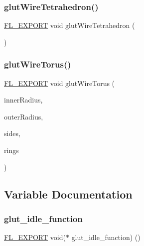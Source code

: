 \subsubsection{\texorpdfstring{glut\+Wire\+Tetrahedron()}{glutWireTetrahedron()}}
{\footnotesize\ttfamily \hyperlink{_fl___export_8_h_aa9ba29a18aee9d738370a06eeb4470fc}{F\+L\+\_\+\+E\+X\+P\+O\+RT} void glut\+Wire\+Tetrahedron (\begin{DoxyParamCaption}{ }\end{DoxyParamCaption})}

\mbox{\label{glut_8_h_adbac466cacdbe5b8241718c2ac9bb27b}} 
\subsubsection{\texorpdfstring{glut\+Wire\+Torus()}{glutWireTorus()}}
{\footnotesize\ttfamily \hyperlink{_fl___export_8_h_aa9ba29a18aee9d738370a06eeb4470fc}{F\+L\+\_\+\+E\+X\+P\+O\+RT} void glut\+Wire\+Torus (\begin{DoxyParamCaption}\item[{G\+Ldouble}]{inner\+Radius,  }\item[{G\+Ldouble}]{outer\+Radius,  }\item[{G\+Lint}]{sides,  }\item[{G\+Lint}]{rings }\end{DoxyParamCaption})}



\subsection{Variable Documentation}
\mbox{\label{glut_8_h_a0d3e0fb3556275a217520263f69a1fae}} 
\subsubsection{\texorpdfstring{glut\+\_\+idle\+\_\+function}{glut\_idle\_function}}
{\footnotesize\ttfamily \hyperlink{_fl___export_8_h_aa9ba29a18aee9d738370a06eeb4470fc}{F\+L\+\_\+\+E\+X\+P\+O\+RT} void($\ast$ glut\+\_\+idle\+\_\+function) ()}

